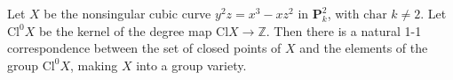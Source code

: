 Let $X$ be the nonsingular cubic curve $y^2z = x^3 - xz^2$ in $\mathbf{P}_k^2$, with $\text{char } k \neq 2$. Let $\text{Cl}^0 X$ be the kernel of the degree map $\text{Cl} X \rightarrow \mathbb{Z}$. Then there is a natural 1-1 correspondence between the set of closed points of $X$ and the elements of the group $\text{Cl}^0 X$, making $X$ into a group variety.
